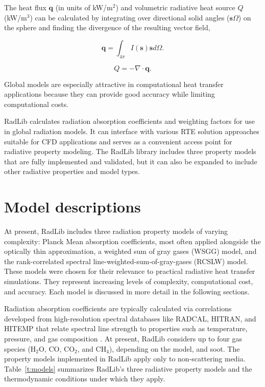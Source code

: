 \documentclass[preprint,12pt]{elsarticle}
\newcounter{bla}
\begin{document}
    The heat flux $\mathbf{q}$ (in units of kW/m$^2$) and volumetric radiative heat source $Q$ (kW/m$^3$) can be calculated by integrating over directional solid angles ($\mathbf{s}\Omega$) on the sphere and finding the divergence of the resulting vector field,
%
    \begin{linenomath}
        \begin{equation}
            \mathbf{q} = \int_{4\pi}I(\mathbf{s})\mathbf{s}d\Omega.
        \end{equation}
    \end{linenomath}
%
    \begin{linenomath}
        \begin{equation}
            Q = -\nabla\cdot\mathbf{q}.
        \end{equation}
    \end{linenomath}
%
    Global models are especially attractive in computational heat transfer applications because they can provide good accuracy
    while limiting computational costs.

    RadLib calculates radiation absorption coefficients and weighting factors
    for use in global radiation models. It can interface with various RTE solution
    approaches suitable for CFD applications and serves as a convenient access
    point for radiative property modeling. The RadLib library includes three
    property models that are fully implemented and validated, but it can also be
    expanded to include other radiative properties and model types.


    \section{Model descriptions} \label{s:models}

    At present, RadLib includes three radiation property models of varying complexity: Planck Mean absorption
    coefficients, most often applied alongside the optically thin approximation, a weighted sum of gray gases (WSGG)
    model, and the rank-correlated spectral line-weighted-sum-of-gray-gases (RCSLW) model. These models were chosen
    for their relevance to practical radiative heat transfer simulations. They represent increasing levels of complexity, computational cost, and accuracy. Each model is discussed in more detail in the following sections.

    Radiation absorption coefficients are typically calculated via correlations developed from high-resolution spectral databases like RADCAL, HITRAN, and HITEMP \citep{Grosshandler_1993,Rothman_2010} that relate spectral line strength to properties such as temperature, pressure, and gas composition \citep{Zhang_2002b}. At present, RadLib considers up to four gas species (H$_2$O, CO, CO$_2$, and CH$_4$), depending on the model, and soot. The property models implemented in RadLib apply only to non-scattering media.
    Table~\ref{t:models} summarizes RadLib's three radiative property models and the thermodynamic conditions under
    which they apply.
\end{document}

